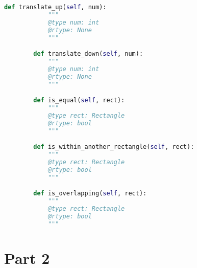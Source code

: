 \documentclass[12pt]{article}
\begin{document}
\begin{enumerate}
\begin{lstlisting}[language=Python]
        def translate_up(self, num):
            """
            @type num: int
            @rtype: None
            """

        def translate_down(self, num):
            """
            @type num: int
            @rtype: None
            """

        def is_equal(self, rect):
            """
            @type rect: Rectangle
            @rtype: bool
            """

        def is_within_another_rectangle(self, rect):
            """
            @type rect: Rectangle
            @rtype: bool
            """

        def is_overlapping(self, rect):
            """
            @type rect: Rectangle
            @rtype: bool
            """

    \end{lstlisting}


\end{enumerate}

\section*{Part 2}
\end{document}

